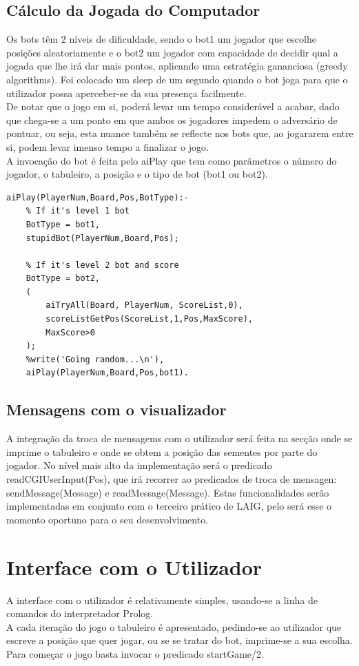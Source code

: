 \documentclass[15pt,a4paper]{article}
\begin{document}
\subsection{Cálculo da Jogada do Computador}
Os bots têm 2 níveis de dificuldade, sendo o bot1 um jogador que escolhe posições aleatoriamente e o bot2 um jogador com capacidade de decidir qual a jogada que lhe irá dar mais pontos, aplicando uma estratégia gananciosa (greedy algorithms). Foi colocado um sleep de um segundo quando o bot joga para que o utilizador possa aperceber-se da sua presença facilmente.\\
\indent De notar que o jogo em si, poderá levar um tempo considerável a acabar, dado que chega-se a um ponto em que ambos os jogadores impedem o adversário de pontuar, ou seja, esta nuance também se reflecte nos bots que, ao jogararem entre si, podem levar imenso tempo a finalizar o jogo.\\
\indent A invocação do bot é feita pelo aiPlay que tem como parâmetros o número do jogador, o tabuleiro, a posição e o tipo de bot (bot1 ou bot2).

\begin{verbatim}
aiPlay(PlayerNum,Board,Pos,BotType):-
	% If it's level 1 bot
	BotType = bot1,
	stupidBot(PlayerNum,Board,Pos);

	% If it's level 2 bot and score
	BotType = bot2,
	(
		aiTryAll(Board, PlayerNum, ScoreList,0),
		scoreListGetPos(ScoreList,1,Pos,MaxScore),
		MaxScore>0
	);
	%write('Going random...\n'),
	aiPlay(PlayerNum,Board,Pos,bot1).

\end{verbatim}


\subsection{Mensagens com o visualizador}
A integração da troca de mensagems com o utilizador será feita na secção onde se imprime o tabuleiro e onde se obtem a posição das sementes por parte do jogador. No nível mais alto da implementação será o predicado readCGIUserInput(Pos), que irá recorrer ao predicados de troca de mensagen: sendMessage(Message) e readMessage(Message). Estas funcionalidades serão implementadas em conjunto com o terceiro prático de LAIG, pelo será esse o momento oportuno para o seu desenvolvimento.


\section{Interface com o Utilizador}
A interface com o utilizador é relativamente simples, usando-se a linha de comandos do interpretador Prolog. \\
\indent A cada iteração do jogo o tabuleiro é apresentado, pedindo-se ao utilizador que escreve a posição que quer jogar, ou se se tratar do bot, imprime-se a sua escolha. Para começar o jogo basta invocar o predicado startGame/2.
\end{document}
